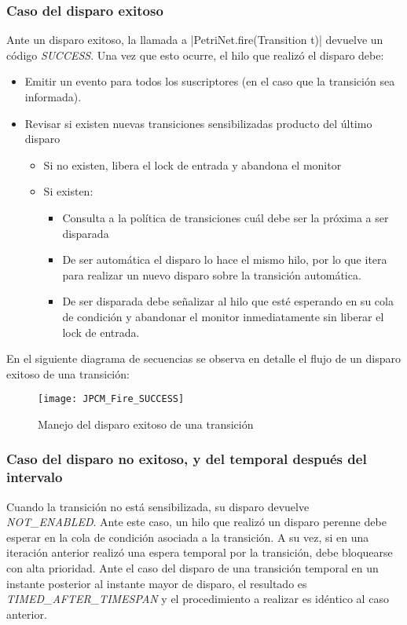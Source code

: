 \subsubsection*{Caso del disparo exitoso}
Ante un disparo exitoso, la llamada a |PetriNet.fire(Transition t)|
devuelve un código \textit{SUCCESS}. Una vez que esto ocurre, el hilo que
realizó el disparo debe:
\begin{itemize}
  \item Emitir un evento para todos los suscriptores (en el caso que la
  transición sea informada).
  \item Revisar si existen nuevas transiciones sensibilizadas producto del
  último disparo
  \begin{itemize}
    \item Si no existen, libera el lock de entrada y abandona el monitor
    \item Si existen:
    \begin{itemize}
        \item Consulta a la política de transiciones cuál debe ser la próxima a ser disparada
        \item De ser automática el disparo lo hace el mismo hilo, por lo que
        itera para realizar un nuevo disparo sobre la transición automática.
        \item De ser disparada debe señalizar al hilo que esté esperando en su
        cola de condición y abandonar el monitor inmediatamente sin liberar el
        lock de entrada.
    \end{itemize}
  \end{itemize}
\end{itemize}

En el siguiente diagrama de secuencias se observa en detalle el flujo de un
disparo exitoso de una transición:

\begin{figure}[H]
  \centering
  \texttt{[image: JPCM\_Fire\_SUCCESS]}
  \caption{Manejo del disparo exitoso de una transición}
  \label{fig:JPCM_Fire_SUCCESS}
\end{figure}

\subsubsection*{Caso del disparo no exitoso, y del temporal después del
intervalo}

Cuando la transición no está sensibilizada, su disparo devuelve
\textit{NOT\_ENABLED}. Ante este caso, un hilo que realizó un disparo perenne
debe esperar en la cola de condición asociada a la transición. A su vez, si en
una iteración anterior realizó una espera temporal por la transición, debe
bloquearse con alta prioridad.
Ante el caso del disparo de una transición temporal en un instante posterior al
instante mayor de disparo, el resultado es \textit{TIMED\_AFTER\_TIMESPAN} y el
procedimiento a realizar es idéntico al caso anterior.
 
